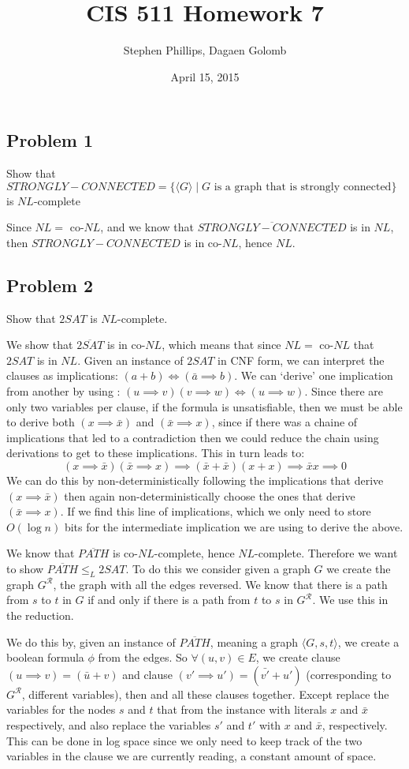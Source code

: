 \documentclass[english]{article}
\title{CIS 511 Homework 7}
\author{Stephen Phillips, Dagaen Golomb}
\date{April 15, 2015}
\begin{document}
\maketitle
\subsection*{Problem 1}
Show that $STRONGLY-CONNECTED = \{ \langle G \rangle \mid G \textrm{ is a graph that is strongly connected} \}$
is $NL$-complete

Since $NL =$ co-$NL$, and we know that $\overline{STRONGLY-CONNECTED}$ is in $NL$, then $STRONGLY-CONNECTED$ is in
co-$NL$, hence $NL$. 

\subsection*{Problem 2}
Show that $2SAT$ is $NL$-complete.

We show that $\overline{2SAT}$ is in co-$NL$, which means that since $NL =$ co-$NL$ that $2SAT$ is in $NL$. Given
an instance of $2SAT$ in CNF form, we can interpret the clauses as implications: $(a + b) \iff (\bar{a} \implies b)$.
We can `derive' one implication from another by using : $(u \implies v)(v \implies w) \iff (u \implies w)$.
Since there are only two variables per clause, if the formula is unsatisfiable, then we must be able to derive both
$(x \implies \bar{x})$ and $(\bar{x} \implies x)$, since if there was a chaine of implications that led to a 
contradiction then we could reduce the chain using derivations to get to these implications.
This in turn leads to:
\[ (x \implies \bar{x})(\bar{x} \implies x) 
\implies (\bar{x} + \bar{x})(x + x) 
\implies \bar{x}x \implies 0 
\]
We can do this by non-deterministically following the implications that derive $(x \implies \bar{x})$ then again
non-deterministically choose the ones that derive $(\bar{x} \implies x)$. If we find this line of implications, 
which we only need to store $O(\log n)$ bits for the intermediate implication we are using to derive the above.

We know that $\overline{PATH}$ is co-$NL$-complete, hence $NL$-complete. Therefore we want to show
$\overline{PATH} \le_L 2SAT$. To do this we consider given a graph $G$ we create the graph $G^\mathcal{R}$, the
graph with all the edges reversed. We know that there is a path from $s$ to $t$ in $G$ if and only if there is a
path from $t$ to $s$ in $G^\mathcal{R}$. We use this in the reduction. 

We do this by, given an instance of $\overline{PATH}$, meaning a graph $\langle G, s, t \rangle$, we create a boolean
formula $\phi$ from the edges. So $\forall (u,v) \in E$, we create clause $(u \implies v) = (\bar{u} + v)$ and clause
$(v' \implies u') = (\bar{v'} + u')$ (corresponding to $G^\mathcal{R}$, different variables), then and all these
clauses together. Except replace the variables for the nodes $s$ and $t$ that from the instance with literals $x$ and
$\bar{x}$ respectively, and also replace the variables $s'$ and $t'$ with $x$ and $\bar{x}$, respectively.
This can be done in log space since we only need to keep track of the two variables in the clause we are currently
reading, a constant amount of space. 
\end{document}
